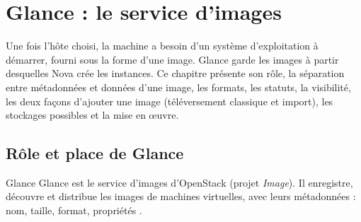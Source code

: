 
\section{Glance : le service d'images}\label{chap:glance}

Une fois l'hôte choisi, la machine a besoin d'un système d'exploitation à démarrer, fourni sous la forme d'une image. Glance
garde les images à partir desquelles Nova crée les instances. Ce chapitre présente son rôle, la séparation entre métadonnées et
données d'une image, les formats, les statuts, la visibilité, les deux façons d'ajouter une image (téléversement classique et
import), les stockages possibles et la mise en œuvre.

\subsection{Rôle et place de Glance}\label{sec:gl-role}

\begin{definition}{Glance}
Glance est le service d'images d'OpenStack (projet \emph{Image}). Il enregistre, découvre et distribue les
\glspl{image} de machines virtuelles, avec leurs métadonnées : nom, taille, format, propriétés
\parencite{glance-admin}.
\end{definition}

